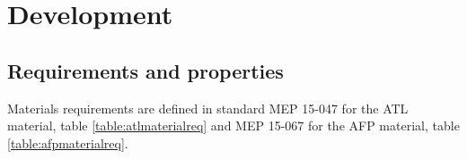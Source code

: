 
\chapter{Development}
\label{development}

\section{Requirements and properties}
\label{req}

Materials requirements are defined in standard MEP 15-047 for the ATL material, table \ref{table:atlmaterialreq} and MEP 15-067 for the AFP material, table \ref{table:afpmaterialreq}.


